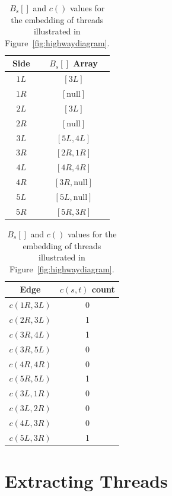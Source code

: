 \begin{table}[h!]
\caption[gPBWT Arrays]{$B_s[]$ and $c()$ values for the embedding of threads illustrated in Figure~\ref{fig:highwaydiagram}.}
\label{tbl:barrays}
\centering
\begin{tabular} { c | c }
Side & $B_s[]$ Array \\
\hline
$1L$ & $[3L]$ \\
$1R$ & $[\mathrm{null}]$ \\
$2L$ & $[3L]$ \\
$2R$ & $[\mathrm{null}]$ \\
$3L$ & $[5L, 4L]$ \\
$3R$ & $[2R, 1R]$ \\
$4L$ & $[4R, 4R]$ \\
$4R$ & $[3R, \mathrm{null}]$ \\
$5L$ & $[5L, \mathrm{null}]$ \\
$5R$ & $[5R, 3R]$ \\
\end{tabular}
\begin{tabular}{ c | c }
Edge & $c(s, t)$ count \\
\hline
$c(1R, 3L)$ & 0 \\
$c(2R, 3L)$ & 1 \\
$c(3R, 4L)$ & 1 \\
$c(3R, 5L)$ & 0 \\
$c(4R, 4R)$ & 0 \\
$c(5R, 5L)$ & 1 \\
$c(3L, 1R)$ & 0 \\
$c(3L, 2R)$ & 0 \\
$c(4L, 3R)$ & 0 \\
$c(5L, 3R)$ & 1 \\
\end{tabular}

\end{table}


\section{Extracting Threads}

